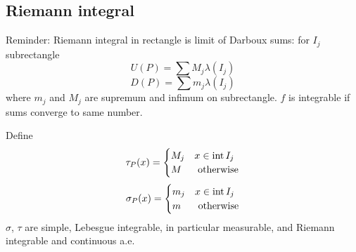 \subsection{Riemann integral}
Reminder: Riemann integral in rectangle is limit of Darboux sums: for $I_j$ subrectangle
$$U(P) = \sum M_j  \lambda(I_j)$$
$$D(P) = \sum m_j  \lambda(I_j)$$
where $m_j$ and $M_j$ are supremum and infimum on subrectangle.
$f$ is integrable if sums converge to same number.

Define
$$\tau_P(x) = \begin{cases}
M_j & x\in \operatorname{int} I_j\\
M & \text{ otherwise}
\end{cases}$$
$$\sigma_P(x) = \begin{cases}
m_j & x\in \operatorname{int} I_j\\
m & \text{ otherwise}
\end{cases}$$
$\sigma$, $\tau$ are simple, Lebesgue integrable, in particular measurable, and Riemann integrable and continuous a.e.

